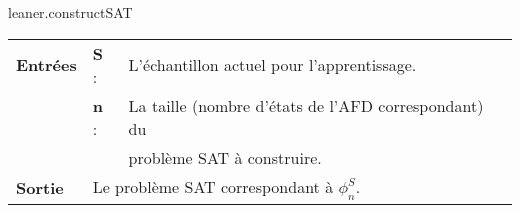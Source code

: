 \documentclass[12pt,a4paper,oneside,titlepage]{report}
\begin{document}
\begin{algorithm}[H]
\caption{leaner.constructSAT}\label{alginfiniteconstructsat}
\hspace*{\algorithmicindent} 
\begin{tabular}{lll}
	\textbf{Entrées} & \textbf{S} : &L'échantillon actuel pour l'apprentissage.\\
	&\textbf{n} : &La taille (nombre d'états de l'AFD correspondant) du\\
	&&problème SAT à construire.\\
	\textbf{Sortie} &\multicolumn{2}{l}{Le problème SAT correspondant à $\phi_n^S$.}\\
\end{tabular}\\
\begin{algorithmic}[1]
\State 
\end{algorithmic}
\end{algorithm}
\end{document}
